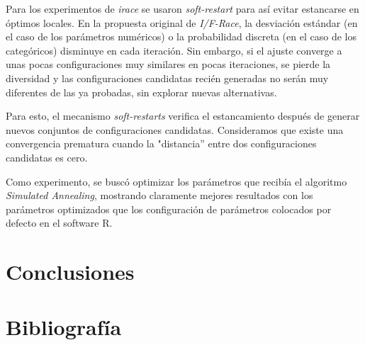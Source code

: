 \documentclass[letter, 10pt]{article}
\begin{document}
\begin{multicols}{2}
Para los experimentos de \textit{irace} se usaron \textit{soft-restart} para así evitar estancarse en óptimos locales. En la propuesta original de \textit{I/F-Race}, la desviación estándar (en el caso de los parámetros numéricos) o la probabilidad discreta (en el caso de los categóricos) disminuye en cada iteración. Sin embargo, si el ajuste converge a unas pocas configuraciones muy similares en pocas iteraciones, se pierde la diversidad y las configuraciones candidatas recién generadas no serán muy diferentes de las ya probadas, sin explorar nuevas alternativas.

Para esto, el mecanismo \textit{soft-restarts} verifica el estancamiento después de generar nuevos conjuntos de configuraciones candidatas. Consideramos que existe una convergencia prematura cuando la "distancia'' entre dos configuraciones candidatas es cero.

Como experimento, se buscó optimizar los parámetros que recibía el algoritmo \textit{Simulated Annealing}, mostrando claramente mejores resultados con los parámetros optimizados que los configuración de parámetros colocados por defecto en el software R.





\section{Conclusiones}

 
\section{Bibliograf\'ia}




\end{multicols}
\end{document}

